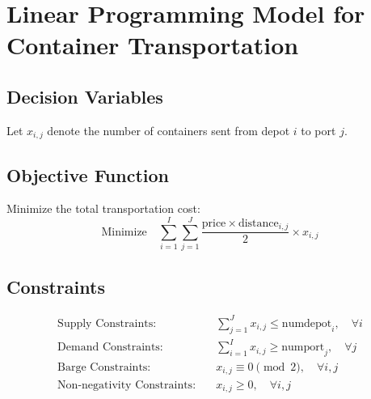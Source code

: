 \documentclass{article}
\begin{document}
\section*{Linear Programming Model for Container Transportation}

\subsection*{Decision Variables}
Let \( x_{i, j} \) denote the number of containers sent from depot \( i \) to port \( j \).

\subsection*{Objective Function}
Minimize the total transportation cost:
\[
\text{Minimize} \quad \sum_{i=1}^{I} \sum_{j=1}^{J} \frac{\text{price} \times \text{distance}_{i, j}}{2} \times x_{i, j}
\]

\subsection*{Constraints}
\begin{align*}
\text{Supply Constraints:} & \quad \sum_{j=1}^{J} x_{i, j} \leq \text{numdepot}_i, \quad \forall i \\
\text{Demand Constraints:} & \quad \sum_{i=1}^{I} x_{i, j} \geq \text{numport}_j, \quad \forall j \\
\text{Barge Constraints:} & \quad x_{i, j} \equiv 0 \pmod{2}, \quad \forall i, j \\
\text{Non-negativity Constraints:} & \quad x_{i, j} \geq 0, \quad \forall i, j
\end{align*}
\end{document}
